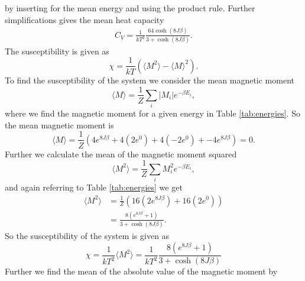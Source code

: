 \documentclass{emulateapj}
\begin{document}
%
by inserting for the mean energy and using the product rule. Further simplifications gives the mean heat capacity
%
\begin{gather*}
    C_V = \frac{1}{kT^2}\frac{64\cosh\left(8J\beta\right)}{ 3 + \cosh\left(8J\beta\right)}.
\end{gather*}
The susceptibility is given as
%
\begin{equation*}
    \chi = \frac{1}{kT}\left(\langle M^2 \rangle - \langle M \rangle^2\right).
\end{equation*}
%
To find the susceptibility of the system we consider the mean magnetic moment
%
\begin{equation*}
    \langle M \rangle = \frac{1}{Z} \sum_i |M_i| e^{-\beta E_i},
\end{equation*}
where we find the magnetic moment for a given energy in Table \ref{tab:energies}. So the mean magnetic moment is
%
\begin{equation*}
    \langle M \rangle = \frac{1}{Z}\left(4e^{8J\beta} + 4\left(2e^{0}\right) + 4\left(-2e^0\right) + -4e^{8J\beta} \right) = 0.
\end{equation*}
%
Further we calculate the mean of the  magnetic moment squared
%
\begin{equation*}
    \langle M^2 \rangle = \frac{1}{Z}\sum_i M_i^2 e^{-\beta E_i},
\end{equation*}
and again referring to Table \ref{tab:energies} we get
%
\begin{align*}
    \langle M^2 \rangle &= \frac{1}{Z}\left(16\left(2e^{8J\beta}\right) + 16\left(2e^0\right) \right) \\
    &= \frac{8\left(e^{8J\beta} + 1\right)}{3 + \cosh\left(8J\beta\right)}.
\end{align*}
So the susceptibility of the system is given as
%
\begin{equation*}
    \chi = \frac{1}{kT^2}\langle M^2 \rangle = \frac{1}{kT^2}\frac{8\left(e^{8J\beta} + 1\right)}{3 + \cosh\left(8J\beta\right)}
\end{equation*}
%
Further we find the mean of the absolute value of the magnetic moment by
\end{document}
